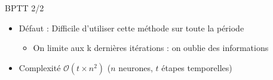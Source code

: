 \begin{frame}{BPTT 2/2}
	\begin{itemize}
		\item Défaut : Difficile d'utiliser cette méthode sur toute la période
		 \begin{itemize}
		 	\item On limite aux k dernières itérations : on oublie des informations
		 \end{itemize}
             \item Complexité $\mathcal{O}(t\times n^2)$ ($n$ neurones, $t$ étapes temporelles)
	\end{itemize}
\end{frame}